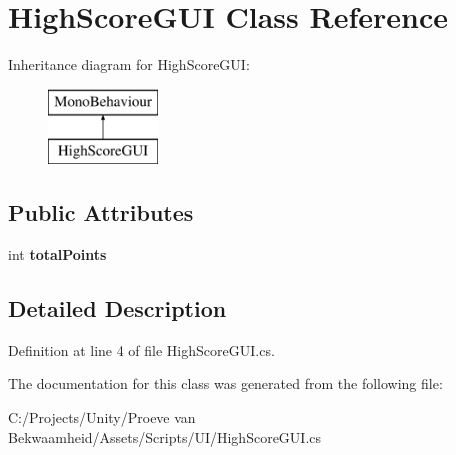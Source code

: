 \hypertarget{class_high_score_g_u_i}{\section{High\+Score\+G\+U\+I Class Reference}
\label{class_high_score_g_u_i}
}
Inheritance diagram for High\+Score\+G\+U\+I\+:\begin{figure}[H]
\begin{center}
\leavevmode
\includegraphics[height=2.000000cm]{class_high_score_g_u_i}
\end{center}
\end{figure}
\subsection*{Public Attributes}
\begin{DoxyCompactItemize}
\item 
\hypertarget{class_high_score_g_u_i_a54ad721c58e2a92affe772079cbfe1e4}{int {\bfseries total\+Points}}\label{class_high_score_g_u_i_a54ad721c58e2a92affe772079cbfe1e4}

\end{DoxyCompactItemize}


\subsection{Detailed Description}


Definition at line 4 of file High\+Score\+G\+U\+I.\+cs.



The documentation for this class was generated from the following file\+:\begin{DoxyCompactItemize}
\item 
C\+:/\+Projects/\+Unity/\+Proeve van Bekwaamheid/\+Assets/\+Scripts/\+U\+I/High\+Score\+G\+U\+I.\+cs\end{DoxyCompactItemize}
